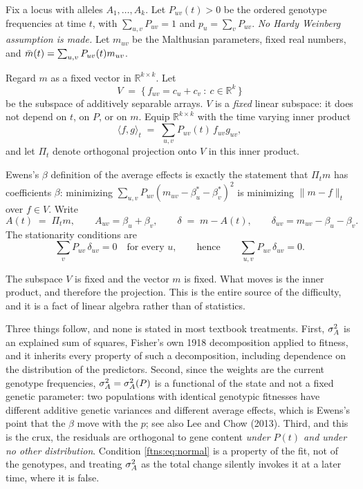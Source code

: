 Fix a locus with alleles $A_1,\dots,A_k$. Let $P_{uv}(t)>0$ be the ordered genotype frequencies at
time $t$, with $\sum_{u,v}P_{uv}=1$ and $p_u=\sum_vP_{uv}$. \emph{No Hardy Weinberg assumption is
made.} Let $m_{uv}$ be the Malthusian parameters, fixed real numbers, and
$\bar{m}(t)=\sum_{u,v}P_{uv}(t)m_{uv}$.

Regard $m$ as a fixed vector in $\mathbb{R}^{k\times k}$. Let
\[
V \;=\; \big\{\,f_{uv}=c_u+c_v \ :\ c\in\mathbb{R}^k\,\big\}
\]
be the subspace of additively separable arrays. $V$ is a \emph{fixed} linear subspace: it does not
depend on $t$, on $P$, or on $m$. Equip $\mathbb{R}^{k\times k}$ with the time varying inner
product
\[
\langle f,g\rangle_t \;=\; \sum_{u,v}P_{uv}(t)\,f_{uv}g_{uv} ,
\]
and let $\Pi_t$ denote orthogonal projection onto $V$ in this inner product.

Ewens's $\beta$ definition of the average effects is exactly the statement that $\Pi_tm$ has
coefficients $\beta$: minimizing $\sum_{u,v}P_{uv}(m_{uv}-\beta_u^\ast-\beta_v^\ast)^2$ is
minimizing $\|m-f\|_t$ over $f\in V$. Write
\[
A(t) \;=\; \Pi_t m, \qquad A_{uv}=\beta_u+\beta_v, \qquad
\delta \;=\; m-A(t), \qquad \delta_{uv}=m_{uv}-\beta_u-\beta_v .
\]
The stationarity conditions are
\begin{equation}
\sum_v P_{uv}\,\delta_{uv}=0 \quad\text{for every }u ,
\qquad\text{hence}\qquad
\sum_{u,v}P_{uv}\,\delta_{uv}=0 .
\label{ftns:eq:normal}
\end{equation}

The subspace $V$ is fixed and the vector $m$ is fixed. What moves is the inner product, and
therefore the projection. This is the entire source of the difficulty, and it is a fact of linear
algebra rather than of statistics.

Three things follow, and none is stated in most textbook treatments. First, $\sigma^{2}_{A}$ is an explained
sum of squares, Fisher's own 1918 decomposition applied to fitness, and it inherits every property
of such a decomposition, including dependence on the distribution of the predictors. Second, since
the weights are the current genotype frequencies, $\sigma^{2}_{A}=\sigma^{2}_{A}(P)$ is a functional of the state and not
a fixed genetic parameter: two populations with identical genotypic fitnesses have different
additive genetic variances and different average effects, which is Ewens's point that the $\beta$
move with the $p$; see also Lee and Chow (2013). Third, and this is the crux, the residuals are
orthogonal to gene content \emph{under $P(t)$ and under no other distribution}. Condition
\eqref{ftns:eq:normal} is a property of the fit, not of the genotypes, and treating $\sigma^{2}_{A}$ as the total
change silently invokes it at a later time, where it is false.

